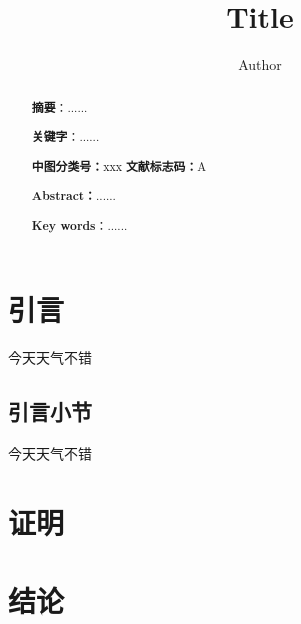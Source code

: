 \documentclass[10.5pt,a4paper,onecolumn]{article}
\title{\vspace{-6ex}Title}
\author{\vspace{-6ex}Author}
\date{}
\begin{document}
\maketitle
\thispagestyle{fancy}

\renewcommand{\abstractname}{}
\begin{abstract}
    \noindent{}\textbf{摘要}：......\par
    \noindent{}\textbf{关键字}：......\par
    \noindent \textbf{中图分类号：}xxx \qquad \textbf{文献标志码：}A
\end{abstract}
\begin{abstract}
    \noindent{}\textbf{Abstract：}......\par
    \noindent{}\textbf{Key words}：......
\end{abstract}

\section{引言}
今天天气不错
\subsection{引言小节}
今天天气不错
\section{证明}
\section{结论}

\newpage
\appendix
\end{document}
